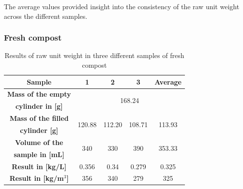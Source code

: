 \documentclass{article}
\begin{document}
The average values provided insight into the consistency of the raw
unit weight across the different samples.

\newpage
\subsubsection{Fresh compost}
\renewcommand{\arraystretch}{1.5}
\begin{table}[ht!]
    \centering \vspace{.3cm}
    \caption{Results of raw unit weight in three different samples of fresh compost}
    \begin{tabular}{|c|c|c|c|c|}
        \hline
        \textbf{Sample} & \textbf{1} & \textbf{2} & \textbf{3} & \textbf{Average}\\
        \hline
        {\textbf{Mass of the empty}} & \multicolumn{4}{c|}{\multirow{2}{*}{168.24}}\\
        \textbf{cylinder in [g]} & \multicolumn{4}{c|}{}\\
        \hline
        \textbf{Mass of the filled} & \multirow{2}{*}{120.88} & \multirow{2}{*}{112.20} & \multirow{2}{*}{108.71} & \multirow{2}{*}{113.93}\\
        \textbf{cylinder [g]} & & & &\\
        \hline
        \textbf{Volume of the} & \multirow{2}{*}{340} & \multirow{2}{*}{330} & \multirow{2}{*}{390} & \multirow{2}{*}{353.33}\\
        \textbf{sample in [mL]} & & & &\\
        \hline
        \textbf{Result in [kg/L]} & 0.356 & 0.34 & 0.279 & 0.325\\
        \hline
        \textbf{Result in [kg/m$^3$]} & 356 & 340 & 279 & 325\\
        \hline
    \end{tabular}
\end{table}
\end{document}
